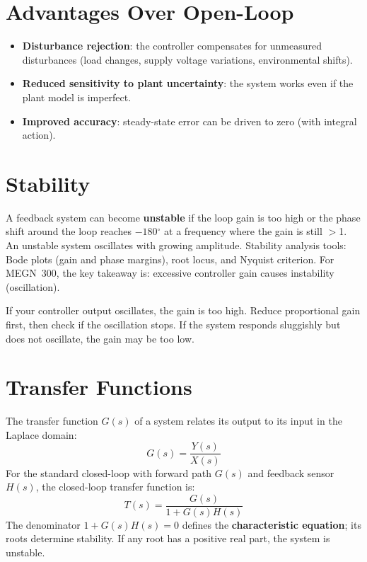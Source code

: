 \documentclass[11pt,letterpaper,twoside,openany]{book}
\providecommand{\ang}[1]{#1\ensuremath{{}^{\circ}}}
\begin{document}
\section{Advantages Over Open-Loop}
\begin{itemize}[leftmargin=1.5em]
\item \textbf{Disturbance rejection}: the controller compensates for unmeasured disturbances (load changes, supply voltage variations, environmental shifts).
\item \textbf{Reduced sensitivity to plant uncertainty}: the system works even if the plant model is imperfect.
\item \textbf{Improved accuracy}: steady-state error can be driven to zero (with integral action).
\end{itemize}

\section{Stability}
A feedback system can become \textbf{unstable} if the loop gain is too high or the phase shift around the loop reaches $-180$\ang{} at a frequency where the gain is still $>$1. An unstable system oscillates with growing amplitude. Stability analysis tools: Bode plots (gain and phase margins), root locus, and Nyquist criterion. For MEGN~300, the key takeaway is: excessive controller gain causes instability (oscillation).

\begin{tipbox}
If your controller output oscillates, the gain is too high. Reduce proportional gain first, then check if the oscillation stops. If the system responds sluggishly but does not oscillate, the gain may be too low.
\end{tipbox}


\section{Transfer Functions}
The transfer function $G(s)$ of a system relates its output to its input in the Laplace domain:
\begin{equation}
G(s) = \frac{Y(s)}{X(s)}
\end{equation}
For the standard closed-loop with forward path $G(s)$ and feedback sensor $H(s)$, the closed-loop transfer function is:
\begin{equation}
T(s) = \frac{G(s)}{1 + G(s)H(s)}
\end{equation}
The denominator $1 + G(s)H(s) = 0$ defines the \textbf{characteristic equation}; its roots determine stability. If any root has a positive real part, the system is unstable.
\end{document}
